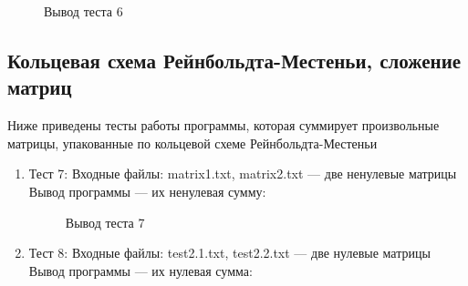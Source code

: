 \documentclass[12pt, a4paper]{article}
\begin{document}
\begin{enumerate}
\begin{figure}[h]
  		\caption{Вывод теста 6}
	\end{figure}
\end{enumerate}
\newpage
\subsection{Кольцевая схема Рейнбольдта-Местеньи, сложение матриц}
Ниже приведены тесты работы программы, которая суммирует произвольные матрицы, 
упакованные по кольцевой схеме Рейнбольдта-Местеньи
\begin{enumerate}
	\item Тест 7:
	Входные файлы: matrix1.txt, 
	matrix2.txt --- две ненулевые матрицы\\
	Вывод программы --- их ненулевая сумму:
	\begin{figure}[h]
  		\caption{Вывод теста 7}
	\end{figure}
	\newpage
	\item Тест 8: Входные файлы: test2.1.txt, 
	test2.2.txt --- две нулевые матрицы\\
	Вывод программы --- их нулевая сумма:
	\begin{figure}[h]

\end{figure}
\end{enumerate}
\end{document}
